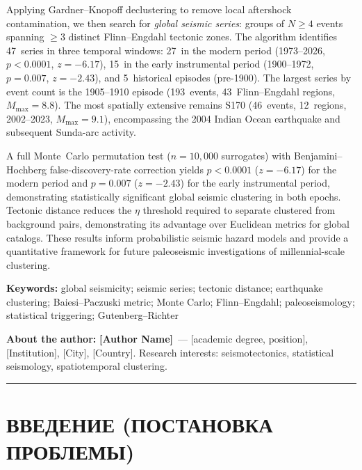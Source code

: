 \documentclass[12pt,a4paper]{article}
\begin{document}
Applying Gardner--Knopoff declustering to remove local aftershock contamination,
we then search for \textit{global seismic series}: groups of $N\geq4$ events
spanning $\geq3$ distinct Flinn--Engdahl tectonic zones. The algorithm identifies
47~series in three temporal windows: 27~in the modern period (1973--2026,
$p<0.0001$, $z=-6.17$), 15~in the early instrumental period (1900--1972,
$p=0.007$, $z=-2.43$), and 5~historical episodes (pre-1900).
The largest series by event count is the 1905--1910 episode
(193~events, 43~Flinn--Engdahl regions, $M_{\max}=8.8$).
The most spatially extensive remains S170 (46~events, 12~regions, 2002--2023,
$M_{\max}=9.1$), encompassing the 2004 Indian Ocean earthquake and subsequent
Sunda-arc activity.

A full Monte~Carlo permutation test ($n=10{,}000$ surrogates) with
Benjamini--Hochberg false-discovery-rate correction yields
$p<0.0001$ ($z=-6.17$) for the modern period and $p=0.007$ ($z=-2.43$)
for the early instrumental period, demonstrating statistically significant
global seismic clustering in both epochs.
Tectonic distance reduces the $\eta$ threshold required to separate clustered
from background pairs, demonstrating its advantage over Euclidean metrics
for global catalogs. These results inform probabilistic seismic hazard models
and provide a quantitative framework for future paleoseismic investigations
of millennial-scale clustering.

\vspace{0.4cm}

\noindent\textbf{Keywords:}
global seismicity;
seismic series;
tectonic distance;
earthquake clustering;
Baiesi--Paczuski metric;
Monte Carlo;
Flinn--Engdahl;
paleoseismology;
statistical triggering;
Gutenberg--Richter

\vspace{0.4cm}

\noindent\textbf{About the author:}
\textbf{[Author Name]}~--- [academic degree, position], [Institution], [City], [Country].
Research interests: seismotectonics, statistical seismology, spatiotemporal clustering.

\vspace{0.8cm}
\hrule
\vspace{0.6cm}


\section*{ВВЕДЕНИЕ (ПОСТАНОВКА ПРОБЛЕМЫ)}
\end{document}
